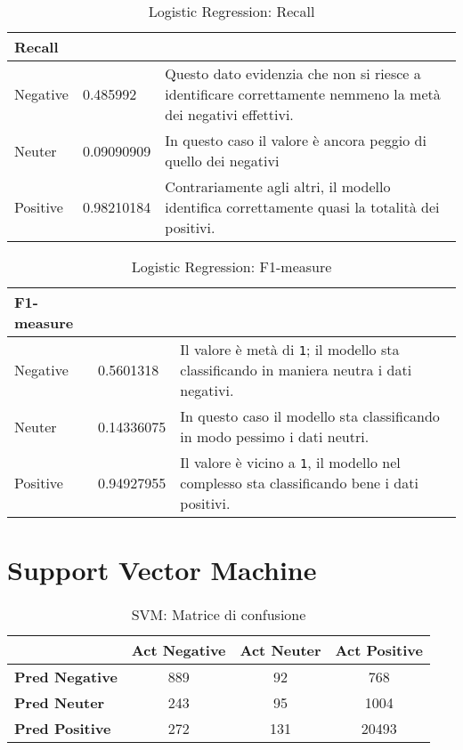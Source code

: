 		
		\begin{table} [H]
			\caption{Logistic Regression: Recall}
			\label{tab:RecallLogisticRegression}
			\centering
			\begin{tabular}{llp{}}
				\toprule 
				\textbf{Recall}	\\
				\midrule
				Negative  & 0.485992  & Questo dato evidenzia che non si riesce a identificare correttamente nemmeno la metà dei negativi effettivi.\\
				Neuter & 0.09090909 & In questo caso il valore è ancora peggio di quello dei negativi\\
				Positive & 0.98210184 & Contrariamente agli altri, il modello identifica correttamente quasi la totalità dei positivi.\\
				\bottomrule
			\end{tabular}
		\end{table}
	
	
		\begin{table} [H]
			\caption{Logistic Regression: F1-measure} 
			\label{tab:F1-measureLogisticRegression}
			\centering
			\begin{tabular}{llp{}}
				\toprule 
				\textbf{F1-measure}	\\
				\midrule
				Negative  & 0.5601318  & Il valore è metà di \verb|1|; il modello sta classificando in maniera neutra i dati negativi.\\
				Neuter & 0.14336075 & In questo caso il modello sta classificando in modo pessimo i dati neutri.\\
				Positive & 0.94927955 & Il valore è vicino a \verb|1|, il modello nel complesso sta classificando bene i dati positivi.\\
				\bottomrule
			\end{tabular}
		\end{table} 
	
	
	\section{Support Vector Machine}
		\begin{table} [H]
			\caption{SVM: Matrice di confusione}
			\label{tab:matriceConfusioneSVM}
			\centering
			\begin{tabular}{lccc}
				\toprule 
				& \textbf{Act Negative} & \textbf{Act Neuter}	& \textbf{Act Positive}\\
				\midrule
				\textbf{Pred Negative}  & 889 & 92 & 768\\
				\textbf{Pred Neuter} & 243 & 95 & 1004\\
				\textbf{Pred Positive} & 272 & 131 & 20493\\
				\bottomrule
			\end{tabular}
		\end{table}
		
